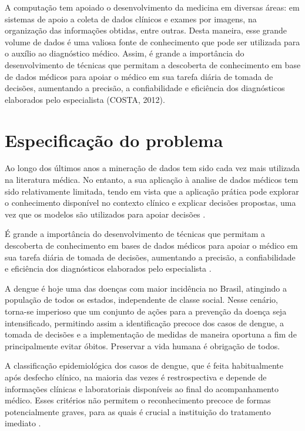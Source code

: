 \documentclass[
	12pt,				%
	openright,			%
	oneside,	
	a4paper,				%
	english,				%
	brazil				%
]{abntex2/abntex2} %
\begin{document}
	A computação tem apoiado o desenvolvimento da medicina em diversas áreas: em sistemas de apoio a coleta de dados clínicos e exames por imagens, na organização das informações obtidas, entre outras. Desta maneira, esse grande volume de dados é uma valiosa fonte de conhecimento que pode ser utilizada para o auxílio ao diagnóstico médico. Assim, é grande a importância do desenvolvimento de técnicas que permitam a descoberta de conhecimento em base de dados médicos para apoiar o médico em sua tarefa diária de tomada de decisões, aumentando a precisão, a confiabilidade e eficiência dos diagnósticos elaborados pelo especialista (COSTA, 2012).
    
    \newpage
	\section{Especificação do problema}
		
		Ao longo dos últimos anos a mineração de dados tem sido cada vez mais utilizada na literatura médica. No entanto, a sua aplicação à analise de dados médicos tem sido relativamente limitada, tendo em vista que a aplicação prática pode explorar o conhecimento disponível no contexto clínico e explicar decisões propostas, uma vez que os modelos são utilizados para apoiar decisões \cite{bellazzi:2008}.
		
		É grande a importância do desenvolvimento de técnicas que permitam a descoberta de conhecimento em bases de dados médicos para apoiar o médico em sua tarefa diária de tomada de decisões, aumentando a precisão, a confiabilidade e eficiência dos diagnósticos elaborados pelo especialista \cite{costa:2012}.
		
		A dengue é hoje uma das doenças com maior incidência no Brasil, atingindo a população de todos os estados, independente de classe social. Nesse cenário, torna-se imperioso que um conjunto de ações para a prevenção da doença seja intensificado, permitindo assim a identificação precoce dos casos de dengue, a tomada de decisões e a implementação de medidas de maneira oportuna a fim de principalmente evitar óbitos. Preservar a vida humana é obrigação de todos.
		
		A classificação epidemiológica dos casos de dengue, que é feita habitualmente após desfecho clínico, na maioria das vezes é restrospectiva e depende de informações clínicas e laboratoriais disponíveis ao final do acompanhamento médico. Esses critérios não permitem o reconhecimento precoce de formas potencialmente graves, para as quais é crucial a instituição do tratamento imediato \cite{saude:2013}.
\end{document}
